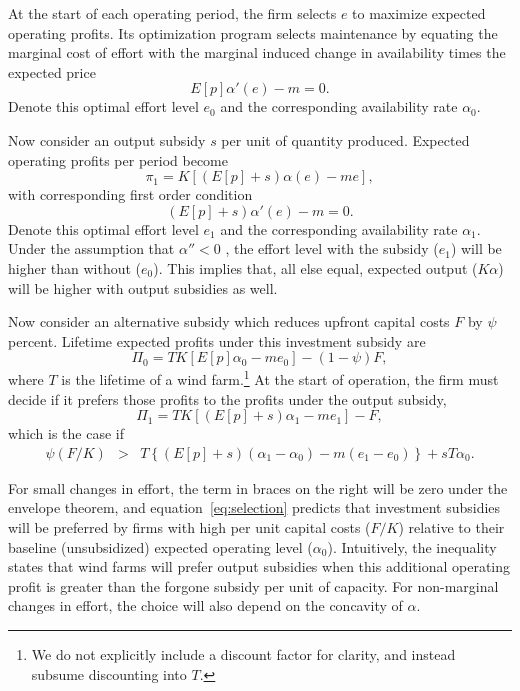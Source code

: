 \documentclass[12pt]{article}
\begin{document}
At the start of each operating period, the firm selects $e$ to maximize expected operating profits. Its optimization program selects maintenance by equating the marginal cost of effort with the marginal induced change in availability times the expected price
\begin{equation}
E[p]\alpha'(e)-m=0.\label{eq:capital_foc}
\end{equation}
Denote this optimal effort level $e_{0}$ and the corresponding availability rate $\alpha_{0}$.

Now consider an output subsidy $s$ per unit of quantity produced. Expected operating profits per period become 
\begin{equation}
\pi_{1}=K[(E[p]+s)\alpha(e)-me],\label{eq:output_op_pi}
\end{equation}
with corresponding first order condition 
\begin{equation}
(E[p]+s)\alpha'(e)-m=0.\label{eq:output_foc}
\end{equation}
Denote this optimal effort level $e_{1}$ and the corresponding availability rate $\alpha_{1}$. Under the assumption that $\alpha''<0$ , the effort level with the subsidy ($e_{1}$) will be higher than without ($e_{0}$). This implies that, all else equal, expected output ($K\alpha$) will be higher with output subsidies as well. 

Now consider an alternative subsidy which reduces upfront capital costs $F$ by $\psi$ percent. Lifetime expected profits under this investment subsidy are 
\begin{equation}
\Pi_{0}=TK[E[p]\alpha_{0}-me_{0}]-(1-\psi)F,\label{eq:capital_Pi_total}
\end{equation}
where $T$ is the lifetime of a wind farm.\footnote{We do not explicitly include a discount factor for clarity, and instead subsume discounting into $T$.} At the start of operation, the firm must decide if it prefers those profits to the profits under the output subsidy, 
\begin{equation}
\Pi_{1}=TK[(E[p]+s)\alpha_{1}-me_{1}]-F,\label{eq:output_Pi_total}
\end{equation}
which is the case if 
\begin{eqnarray}
\psi(F/K) & > & T\left\{ (E[p]+s)(\alpha_{1}-\alpha_{0})-m(e_{1}-e_{0})\right\} +s T\alpha_{0}.\label{eq:selection}
\end{eqnarray}

For small changes in effort, the term in braces on the right will be zero under the envelope theorem, and equation~\ref{eq:selection} predicts that investment subsidies will be preferred by firms with high per unit capital costs ($F/K$) relative to their baseline (unsubsidized) expected operating level ($\alpha_{0}$). Intuitively, the inequality states that wind farms will prefer output subsidies when this additional operating profit is greater than the forgone subsidy per unit of capacity. For non-marginal changes in effort, the choice will also depend on the concavity of $\alpha$.
\end{document}
